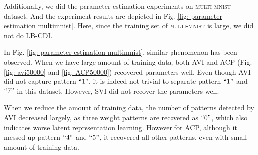 \documentclass[twoside]{article}
\begin{document}
Additionally, we did the parameter estimation experiments on \textsc{multi-mnist} dataset. And the experiment results are depicted in Fig. \ref{fig: parameter estimation multimnist}. Here, since the training set of \textsc{multi-mnist} is large, we did not do LB-CDI.

In Fig. \ref{fig: parameter estimation multimnist}, similar phenomenon has been observed. When we have large amount of training data, both AVI and ACP (Fig. \ref{fig: avi50000} and \ref{fig: ACP50000}) recovered parameters well. Even though AVI did not capture pattern $``1"$, it is indeed not trivial to separate pattern $``1"$ and $``7"$ in this dataset. However, SVI did not recover the parameters well. 

When we reduce the amount of training data, the number of patterns detected by AVI decreased largely, as three weight patterns are recovered as $``0"$, which also indicates worse latent representation learning.  However for ACP, although it messed up pattern $``4"$ and $``5"$, it recovered all other patterns, even with small amount of training data. 
\end{document}
